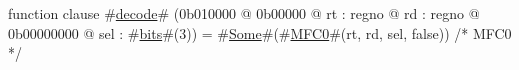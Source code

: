 function clause #\hyperref[zdecode]{decode}# (0b010000 @ 0b00000 @ rt : regno @ rd : regno @ 0b00000000 @ sel : #\hyperref[zbits]{bits}#(3)) =
  #\hyperref[zSome]{Some}#(#\hyperref[zMFCzero]{MFC0}#(rt, rd, sel, false)) /* MFC0 */
